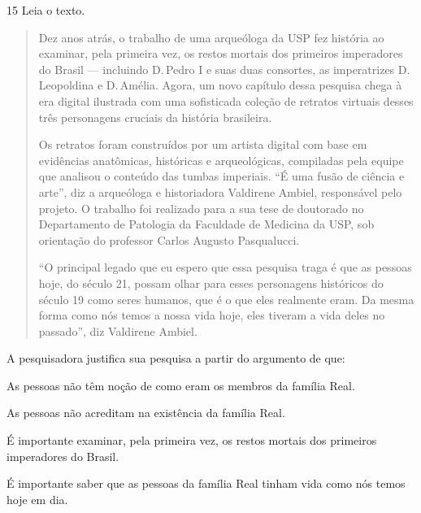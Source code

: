 \num{15} Leia o texto.

\begin{quote}
\noindent Dez anos atrás, o trabalho de uma arqueóloga da USP fez história ao
examinar, pela primeira vez, os restos mortais dos primeiros imperadores
do Brasil — incluindo D.\,Pedro I e suas duas consortes, as
imperatrizes D.\,Leopoldina e D.\,Amélia. Agora, um novo capítulo dessa
pesquisa chega à era digital ilustrada com uma sofisticada coleção de
retratos virtuais desses três personagens cruciais da história
brasileira.

Os retratos foram construídos por um artista digital com base em
evidências anatômicas, históricas e arqueológicas, compiladas pela
equipe que analisou o conteúdo das tumbas imperiais. ``É uma fusão de
ciência e arte'', diz a arqueóloga e historiadora Valdirene Ambiel,
responsável pelo projeto. O trabalho foi realizado para a sua tese de
doutorado no Departamento de Patologia da Faculdade de Medicina da USP,
sob orientação do professor Carlos Augusto Pasqualucci.

``O principal legado que eu espero que essa pesquisa traga é que as
pessoas hoje, do século 21, possam olhar para esses personagens
históricos do século 19 como seres humanos, que é o que eles realmente
eram. Da mesma forma como nós temos a nossa vida hoje, eles tiveram a
vida deles no passado'', diz Valdirene Ambiel.

\end{quote}

\noindent A pesquisadora justifica sua pesquisa a partir do argumento de que:

\begin{escolha}
\item As pessoas não têm noção de como eram os membros da família Real.
\item As pessoas não acreditam na existência da família Real.
\item É importante examinar, pela primeira vez, os restos mortais dos
primeiros imperadores do Brasil.
\item É importante saber que as pessoas da família Real tinham vida como
nós temos hoje em dia.
\end{escolha}


